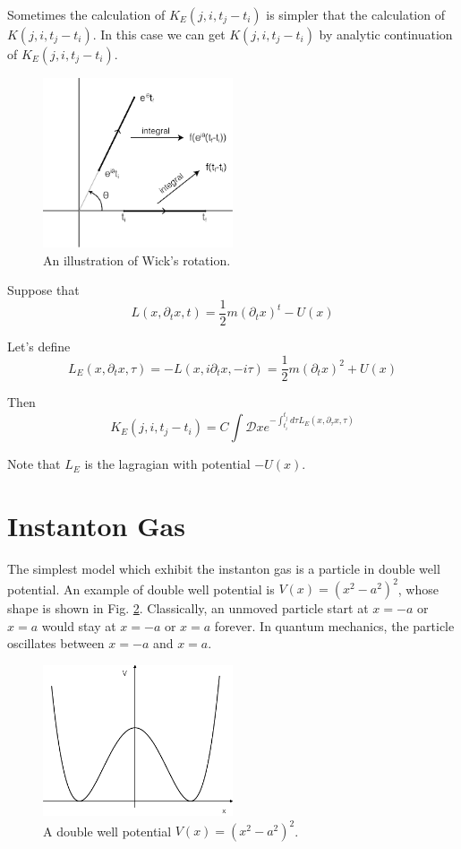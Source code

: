 \documentclass[12pt]{book}
\begin{document}
	Sometimes the calculation of $K_E(j,i,t_j-t_i)$ is simpler that the calculation of $K(j,i,t_j-t_i)$. In this case we can get $K(j,i,t_j-t_i)$ by analytic continuation of $K_E(j,i,t_j-t_i)$.
	\begin{figure}[htb!]
		\centering  
		\includegraphics[width=0.5\textwidth]{resources/chap_path_int/wickrot.pdf}
		\caption{An illustration of Wick's rotation.}
		\label{fig:wickrot} 
	\end{figure}
	
	Suppose that 
	\begin{equation}
		L(x,\partial_t x,t)=\frac 12 m (\partial_t x)^t-U(x)
	\end{equation}
	
	Let's define
	\begin{equation}
		L_E(x,\partial_t x,\tau)=-L(x,i\partial_t x,-i\tau)=\frac 12 m (\partial_t x)^2+U(x)
	\end{equation}
	
	Then
	\begin{equation}
		K_E(j,i,t_j-t_i)=C\int \mathcal Dxe^{-\int_{t_i}^{t_j}d\tau L_E(x,\partial_\tau x,\tau)}
	\end{equation}
	
	Note that $L_E$ is the lagragian with potential $-U(x)$.
	\section{Instanton Gas}
	
	The simplest model which exhibit the instanton gas is a particle in double well potential. An example of double well potential is $V(x)=(x^2-a^2)^2$, whose shape is shown in Fig. \ref{fig:dblwell}. Classically, an unmoved particle start at $x=-a$ or $x=a$ would stay at $x=-a$ or $x=a$ forever. In quantum mechanics, the particle oscillates between $x=-a$ and $x=a$.
	\begin{figure}[htb!]
		\centering  
		\includegraphics[width=0.5\textwidth]{resources/chap_path_int/doublewell.pdf}
		\caption{A double well potential $V(x)=(x^2-a^2)^2$.}
		\label{fig:dblwell} 
	\end{figure}
	
\end{document}
